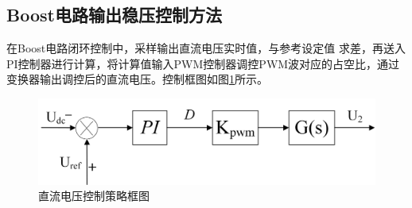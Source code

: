 \documentclass[12pt]{ctexart}
\begin{document}
\subsection{Boost电路输出稳压控制方法}
在Boost电路闭环控制中，采样输出直流电压实时值，与参考设定值 求差，再送入PI控制器进行计算，将计算值输入PWM控制器调控PWM波对应的占空比，通过变换器输出调控后的直流电压。控制框图如图\ref{dc_control}所示。

\begin{figure}[htbp]
  \centering
  \includegraphics[width=0.9\linewidth]{img/dc control.png}
  \caption{直流电压控制策略框图}
  \label{dc_control}
\end{figure}
\end{document}
